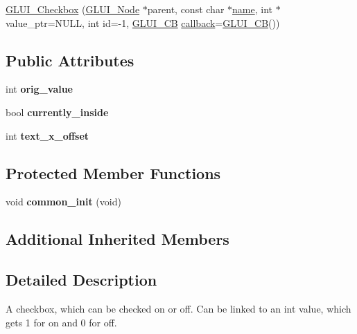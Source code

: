 \begin{DoxyCompactItemize}
\item 
\hyperlink{classGLUI__Checkbox_a37dc0700283da8c9e05d57153f04e59b}{G\-L\-U\-I\-\_\-\-Checkbox} (\hyperlink{classGLUI__Node}{G\-L\-U\-I\-\_\-\-Node} $\ast$parent, const char $\ast$\hyperlink{classGLUI__Control_aa95b97d50df45335fc33f0af03958eb3}{name}, int $\ast$value\-\_\-ptr=N\-U\-L\-L, int id=-\/1, \hyperlink{classGLUI__CB}{G\-L\-U\-I\-\_\-\-C\-B} \hyperlink{classGLUI__Control_a96060fe0cc6d537e736dd6eef78e24ab}{callback}=\hyperlink{classGLUI__CB}{G\-L\-U\-I\-\_\-\-C\-B}())
\end{DoxyCompactItemize}
\subsection*{Public Attributes}
\begin{DoxyCompactItemize}
\item 
\hypertarget{classGLUI__Checkbox_a4b98b08b7a7aa76b9a2d11769c36afe0}{int {\bfseries orig\-\_\-value}}\label{classGLUI__Checkbox_a4b98b08b7a7aa76b9a2d11769c36afe0}

\item 
\hypertarget{classGLUI__Checkbox_a67719010e5421edee03a1a7c98dc34d0}{bool {\bfseries currently\-\_\-inside}}\label{classGLUI__Checkbox_a67719010e5421edee03a1a7c98dc34d0}

\item 
\hypertarget{classGLUI__Checkbox_ac3cec38298f8c0f6a1573070c759fcbe}{int {\bfseries text\-\_\-x\-\_\-offset}}\label{classGLUI__Checkbox_ac3cec38298f8c0f6a1573070c759fcbe}

\end{DoxyCompactItemize}
\subsection*{Protected Member Functions}
\begin{DoxyCompactItemize}
\item 
\hypertarget{classGLUI__Checkbox_abce9cded0f247b501c92b7037d7036e0}{void {\bfseries common\-\_\-init} (void)}\label{classGLUI__Checkbox_abce9cded0f247b501c92b7037d7036e0}

\end{DoxyCompactItemize}
\subsection*{Additional Inherited Members}


\subsection{Detailed Description}
A checkbox, which can be checked on or off. Can be linked to an int value, which gets 1 for on and 0 for off. 

